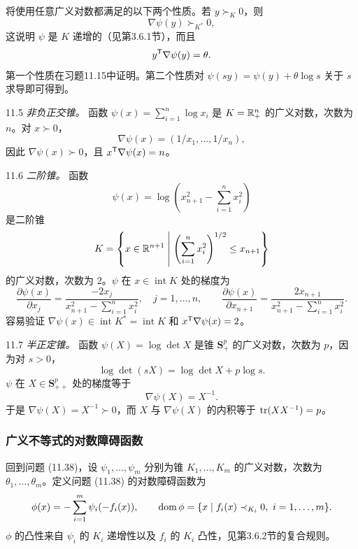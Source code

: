 将使用任意广义对数都满足的以下两个性质。若 $y\succ_K0$，则
\begin{equation}
\nabla\psi(y)\succ_{K^*}0,\tag{11.40}
\end{equation}
这说明 $\psi$ 是 $K$ 递增的（见第3.6.1节），而且
\[
y^\mathsf T\nabla\psi(y)=\theta.
\]
第一个性质在习题11.15中证明。第二个性质对 $\psi(sy)=\psi(y)+\theta\log s$ 关于 $s$ 求导即可得到。

\begin{origexample}{11.5}
\emph{非负正交锥。} 函数 $\psi(x)=\sum_{i=1}^n\log x_i$ 是 $K=\mathbb R_+^n$ 的广义对数，次数为 $n$。对 $x\succ0$，
\[
\nabla\psi(x)=(1/x_1,\ldots,1/x_n),
\]
因此 $\nabla\psi(x)\succ0$，且 $x^\mathsf T\nabla\psi(x)=n$。
\end{origexample}

\begin{origexample}{11.6}
\emph{二阶锥。} 函数
\[
\psi(x)=\log\left(x_{n+1}^2-\sum_{i=1}^n x_i^2\right)
\]
是二阶锥
\[
K=\left\{x\in\mathbb R^{n+1}\;\middle|\;\left(\sum_{i=1}^n x_i^2\right)^{1/2}\le x_{n+1}\right\}
\]
的广义对数，次数为 $2$。$\psi$ 在 $x\in\operatorname{int}K$ 处的梯度为
\[
\frac{\partial\psi(x)}{\partial x_j}=\frac{-2x_j}{x_{n+1}^2-\sum_{i=1}^n x_i^2},\quad j=1,\ldots,n,
\qquad
\frac{\partial\psi(x)}{\partial x_{n+1}}=\frac{2x_{n+1}}{x_{n+1}^2-\sum_{i=1}^n x_i^2}.
\]
容易验证 $\nabla\psi(x)\in\operatorname{int}K^*=\operatorname{int}K$ 和 $x^\mathsf T\nabla\psi(x)=2$。
\end{origexample}

\begin{origexample}{11.7}
\emph{半正定锥。} 函数 $\psi(X)=\log\det X$ 是锥 $\mathbf S_+^p$ 的广义对数，次数为 $p$，因为对 $s>0$，
\[
\log\det(sX)=\log\det X+p\log s.
\]
$\psi$ 在 $X\in\mathbf S_{++}^p$ 处的梯度等于
\[
\nabla\psi(X)=X^{-1}.
\]
于是 $\nabla\psi(X)=X^{-1}\succ0$，而 $X$ 与 $\nabla\psi(X)$ 的内积等于 $\operatorname{tr}(XX^{-1})=p$。
\end{origexample}

\subsubsection*{广义不等式的对数障碍函数}
回到问题 (11.38)，设 $\psi_1,\ldots,\psi_m$ 分别为锥 $K_1,\ldots,K_m$ 的广义对数，次数为 $\theta_1,\ldots,\theta_m$。定义问题 (11.38) 的对数障碍函数为
\[
\phi(x)=-\sum_{i=1}^m\psi_i(-f_i(x)),\qquad
\operatorname{dom}\phi=\{x\mid f_i(x)\prec_{K_i}0,\ i=1,\ldots,m\}.
\]
$\phi$ 的凸性来自 $\psi_i$ 的 $K_i$ 递增性以及 $f_i$ 的 $K_i$ 凸性，见第3.6.2节的复合规则。

